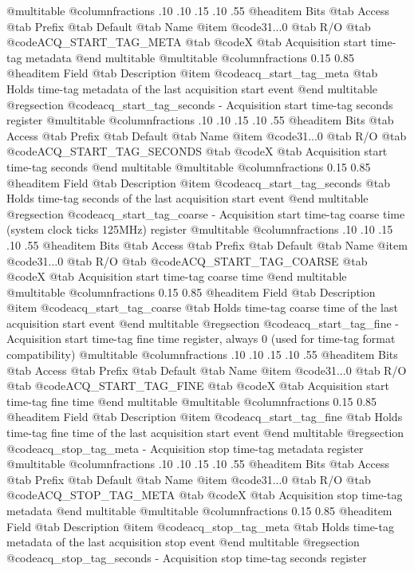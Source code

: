 @multitable @columnfractions .10 .10 .15 .10 .55
@headitem Bits @tab Access @tab Prefix @tab Default @tab Name
@item @code{31...0}
@tab R/O @tab
@code{ACQ_START_TAG_META}
@tab @code{X} @tab 
Acquisition start time-tag metadata
@end multitable
@multitable @columnfractions 0.15 0.85
@headitem Field @tab Description
@item @code{acq_start_tag_meta} @tab Holds time-tag metadata of the last acquisition start event
@end multitable
@regsection @code{acq_start_tag_seconds} - Acquisition start time-tag seconds register
@multitable @columnfractions .10 .10 .15 .10 .55
@headitem Bits @tab Access @tab Prefix @tab Default @tab Name
@item @code{31...0}
@tab R/O @tab
@code{ACQ_START_TAG_SECONDS}
@tab @code{X} @tab 
Acquisition start time-tag seconds
@end multitable
@multitable @columnfractions 0.15 0.85
@headitem Field @tab Description
@item @code{acq_start_tag_seconds} @tab Holds time-tag seconds of the last acquisition start event
@end multitable
@regsection @code{acq_start_tag_coarse} - Acquisition start time-tag coarse time (system clock ticks 125MHz) register
@multitable @columnfractions .10 .10 .15 .10 .55
@headitem Bits @tab Access @tab Prefix @tab Default @tab Name
@item @code{31...0}
@tab R/O @tab
@code{ACQ_START_TAG_COARSE}
@tab @code{X} @tab 
Acquisition start time-tag coarse time
@end multitable
@multitable @columnfractions 0.15 0.85
@headitem Field @tab Description
@item @code{acq_start_tag_coarse} @tab Holds time-tag coarse time of the last acquisition start event
@end multitable
@regsection @code{acq_start_tag_fine} - Acquisition start time-tag fine time register, always 0 (used for time-tag format compatibility)
@multitable @columnfractions .10 .10 .15 .10 .55
@headitem Bits @tab Access @tab Prefix @tab Default @tab Name
@item @code{31...0}
@tab R/O @tab
@code{ACQ_START_TAG_FINE}
@tab @code{X} @tab 
Acquisition start time-tag fine time
@end multitable
@multitable @columnfractions 0.15 0.85
@headitem Field @tab Description
@item @code{acq_start_tag_fine} @tab Holds time-tag fine time of the last acquisition start event
@end multitable
@regsection @code{acq_stop_tag_meta} - Acquisition stop time-tag metadata register
@multitable @columnfractions .10 .10 .15 .10 .55
@headitem Bits @tab Access @tab Prefix @tab Default @tab Name
@item @code{31...0}
@tab R/O @tab
@code{ACQ_STOP_TAG_META}
@tab @code{X} @tab 
Acquisition stop time-tag metadata
@end multitable
@multitable @columnfractions 0.15 0.85
@headitem Field @tab Description
@item @code{acq_stop_tag_meta} @tab Holds time-tag metadata of the last acquisition stop event
@end multitable
@regsection @code{acq_stop_tag_seconds} - Acquisition stop time-tag seconds register
